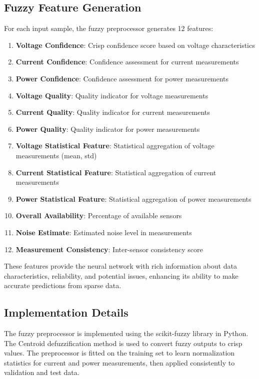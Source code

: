 \documentclass[12pt,a4paper]{report}
\begin{document}
\subsection{Fuzzy Feature Generation}

For each input sample, the fuzzy preprocessor generates 12 features:

\begin{enumerate}
    \item \textbf{Voltage Confidence}: Crisp confidence score based on voltage characteristics
    \item \textbf{Current Confidence}: Confidence assessment for current measurements
    \item \textbf{Power Confidence}: Confidence assessment for power measurements
    \item \textbf{Voltage Quality}: Quality indicator for voltage measurements
    \item \textbf{Current Quality}: Quality indicator for current measurements
    \item \textbf{Power Quality}: Quality indicator for power measurements
    \item \textbf{Voltage Statistical Feature}: Statistical aggregation of voltage measurements (mean, std)
    \item \textbf{Current Statistical Feature}: Statistical aggregation of current measurements
    \item \textbf{Power Statistical Feature}: Statistical aggregation of power measurements
    \item \textbf{Overall Availability}: Percentage of available sensors
    \item \textbf{Noise Estimate}: Estimated noise level in measurements
    \item \textbf{Measurement Consistency}: Inter-sensor consistency score
\end{enumerate}

These features provide the neural network with rich information about data characteristics, reliability, and potential issues, enhancing its ability to make accurate predictions from sparse data.

\subsection{Implementation Details}

The fuzzy preprocessor is implemented using the scikit-fuzzy library in Python. The Centroid defuzzification method is used to convert fuzzy outputs to crisp values. The preprocessor is fitted on the training set to learn normalization statistics for current and power measurements, then applied consistently to validation and test data.
\end{document}
